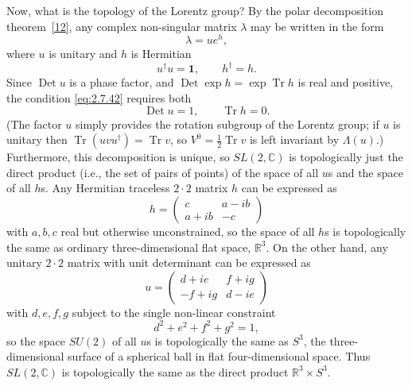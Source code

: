 Now, what is the topology of the Lorentz group? By the polar decomposition
theorem~\hyperref[ref:2.12]{[12]}, any complex non-singular matrix $\lambda$ may be
written in the form
\begin{equation*}
  \lambda=u e^h,
\end{equation*}
where $u$ is unitary and $h$ is Hermitian
\begin{equation*}
  u^\dagger u=\mathbf{1},
  \qquad
  h^\dagger=h.
\end{equation*}
Since $\operatorname{Det}u$ is a phase factor, and
$\operatorname{Det}\exp h=\exp\operatorname{Tr}h$ is real and positive, the
condition \eqref{eq:2.7.42} requires both
\begin{equation*}
  \operatorname{Det}u=1,
  \qquad
  \operatorname{Tr}h=0.
\end{equation*}
(The factor $u$ simply provides the rotation subgroup of the Lorentz group; if
$u$ is unitary then $\operatorname{Tr}(uvu^\dagger)=\operatorname{Tr}v$, so
$V^0=\tfrac12\operatorname{Tr}v$ is left invariant by $\Lambda(u)$.)
Furthermore, this decomposition is unique, so $SL(2,\mathbb{C})$ is topologically just
the direct product (i.e., the set of pairs of points) of the space of all $u$s
and the space of all $h$s. Any Hermitian traceless $2\cdot2$ matrix $h$ can be
expressed as
\begin{equation*}
  h=\begin{pmatrix}
    c & a-ib\\
    a+ib & -c
  \end{pmatrix}
\end{equation*}
with $a,b,c$ real but otherwise unconstrained, so the space of all $h$s is
topologically the same as ordinary three-dimensional flat space, $\mathbb{R}^3$. On the
other hand, any unitary $2\cdot2$ matrix with unit determinant can be expressed
as
\begin{equation*}
  u=\begin{pmatrix}
    d+ie & f+ig\\
    -f+ig & d-ie
  \end{pmatrix}
\end{equation*}
with $d,e,f,g$ subject to the single non-linear constraint
\begin{equation*}
  d^2+e^2+f^2+g^2=1,
\end{equation*}
so the space $SU(2)$ of all $u$s is topologically the same as $S^3$, the
three-dimensional surface of a spherical ball in flat four-dimensional space.
Thus $SL(2,\mathbb{C})$ is topologically the same as the direct product $\mathbb{R}^3\times S^3$.
